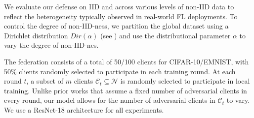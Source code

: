 We evaluate our defense on IID and across various levels of non-IID data to reflect the heterogeneity typically observed in real-world FL deployments. To control the degree of non-IID-ness, we partition the global dataset using a Dirichlet distribution $Dir(\alpha)$ \citep{li2021federatedlearningnoniiddata} (see ) and use the distributional parameter $\alpha$ to vary the degree of non-IID-nes.

 The federation consists of a total of 50/100 clients for CIFAR-10/EMNIST, with 50\% clients randomly selected to participate in each training round. At each round \(t\), a subset of $m$ clients \(\mathcal{C}_t \subseteq \mathcal{N}\) is randomly selected to participate in local training. Unlike prior works \citep{blanchard2017machine,zhang2023flip} that assume a fixed number of adversarial clients in every round, our model allows for the number of adversarial clients in \(\mathcal{C}_t\) to vary. We use a ResNet-18 architecture \citep{he2015deepresiduallearningimage} for all experiments.



